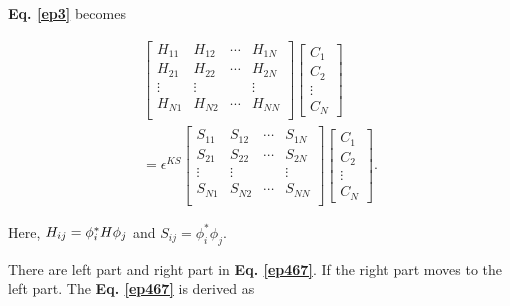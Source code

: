 \documentclass[a4paper, 12pt, titlepage,oneside,drop]{kthesis}
\begin{document}
\textbf{Eq. \ref{ep3}} becomes

\begin{equation}\begin{split}\label{ep467}
\left[
\begin{matrix}
    H_{11} & H_{12} & \cdots & H_{1N} \\
    H_{21} & H_{22} & \cdots & H_{2N} \\
    \vdots               & \vdots               &        & \vdots               \\
     H_{N1} & H_{N2} & \cdots & H_{NN} \\
\end{matrix} \right] \left[ \begin{array}{c} C_1 \\ C_2 \\ \vdots \\ C_N\end{array} \right] \\
= \epsilon^{KS} \left[
\begin{matrix}
    S_{11} & S_{12} & \cdots & S_{1N} \\
    S_{21} & S_{22} & \cdots & S_{2N} \\
    \vdots               & \vdots               &        & \vdots               \\
     S_{N1} & S_{N2} & \cdots & S_{NN} \\
\end{matrix} \right]\left[ \begin{array}{c} C_1 \\ C_2 \\ \vdots \\ C_N\end{array} \right].
\end{split}\end{equation}

Here, $H_{ij} = \phi^*_i {H} \phi_j$ and $S_{ij} = \phi^*_i \phi_j$.

There are left part and right part in \textbf{Eq. \ref{ep467}}. If the right part moves to the left part. The \textbf{Eq. \ref{ep467}} is derived as 
\end{document}
